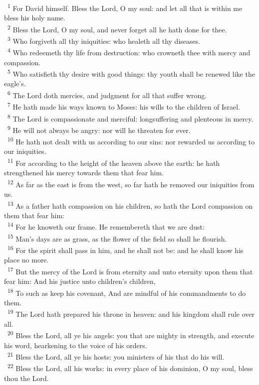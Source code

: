 \documentclass[a5paper,12pt]{article}
\begin{document}
\begin{multicols*}{2}
~\textsuperscript{1} For David himself. Bless the Lord, O my soul: and let all that is within me bless his holy name.\\
~\textsuperscript{2} Bless the Lord, O my soul, and never forget all he hath done for thee.\\
~\textsuperscript{3} Who forgiveth all thy iniquities: who healeth all thy diseases.\\
~\textsuperscript{4} Who redeemeth thy life from destruction: who crowneth thee with mercy and compassion.\\
~\textsuperscript{5} Who satisfieth thy desire with good things: thy youth shall be renewed like the eagle's.\\
~\textsuperscript{6} The Lord doth mercies, and judgment for all that suffer wrong.\\
~\textsuperscript{7} He hath made his ways known to Moses: his wills to the children of Israel.\\
~\textsuperscript{8} The Lord is compassionate and merciful: longsuffering and plenteous in mercy.\\
~\textsuperscript{9} He will not always be angry: nor will he threaten for ever.\\
~\textsuperscript{10} He hath not dealt with us according to our sins: nor rewarded us according to our iniquities.\\
~\textsuperscript{11} For according to the height of the heaven above the earth: he hath strengthened his mercy towards them that fear him.\\
~\textsuperscript{12} As far as the east is from the west, so far hath he removed our iniquities from us.\\
~\textsuperscript{13} As a father hath compassion on his children, so hath the Lord compassion on them that fear him:\\
~\textsuperscript{14} For he knoweth our frame. He remembereth that we are dust:\\
~\textsuperscript{15} Man's days are as grass, as the flower of the field so shall he flourish.\\
~\textsuperscript{16} For the spirit shall pass in him, and he shall not be: and he shall know his place no more.\\
~\textsuperscript{17} But the mercy of the Lord is from eternity and unto eternity upon them that fear him: And his justice unto children's children,\\
~\textsuperscript{18} To such as keep his covenant, And are mindful of his commandments to do them.\\
~\textsuperscript{19} The Lord hath prepared his throne in heaven: and his kingdom shall rule over all.\\
~\textsuperscript{20} Bless the Lord, all ye his angels: you that are mighty in strength, and execute his word, hearkening to the voice of his orders.\\
~\textsuperscript{21} Bless the Lord, all ye his hosts: you ministers of his that do his will.\\
~\textsuperscript{22} Bless the Lord, all his works: in every place of his dominion, O my soul, bless thou the Lord.\\


\end{multicols*}
\end{document}
